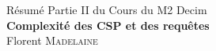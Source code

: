 \documentclass[a4paper,12pt]{article}
\theoremstyle{definition}
\theoremstyle{remark}
\begin{document}

\begin{center}
  \LARGE{Résumé Partie II du Cours %
    du M2 Decim}\\
  \Large \textbf{Complexité des CSP et des requêtes}\\
  Florent \textsc{Madelaine}
\end{center}

\end{document}
